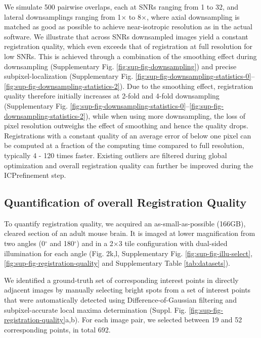 We simulate 500 pairwise overlaps, each at SNRs ranging from 1 to 32, and lateral downsamplings ranging from 1$\times$ to 8$\times$, where axial downsampling is matched as good as possible to achieve near-isotropic resolution as in the actual software. We illustrate that across SNRs downsampled images yield a constant registration quality, which even exceeds that of registration at full resolution for low SNRs. This is achieved through a combination of the smoothing effect during downsampling (Supplementary Fig. \ref{fig:sup-fig-downsampling}) and precise subpixel-localization (Supplementary Fig. \ref{fig:sup-fig-downsampling-statistics-0}--\ref{fig:sup-fig-downsampling-statistics-2}). Due to the smoothing effect, registration quality therefore initially increases at 2-fold and 4-fold downsampling (Supplementary Fig. \ref{fig:sup-fig-downsampling-statistics-0}--\ref{fig:sup-fig-downsampling-statistics-2}), while when using more downsampling, the loss of pixel resolution outweighs the effect of smoothing and hence the quality drops. Registrations with a constant quality of an average error of below one pixel can be computed at a fraction of the computing time compared to full resolution, typically 4 - 120 times faster. Existing outliers are filtered during global optimization and overall registration quality can further be improved during the ICP\cite{icp }refinement step.

\subsection*{Quantification of overall Registration Quality}

To quantify registration quality, we acquired an as-small-as-possible (166GB), cleared section of an adult mouse brain. It is imaged at lower magnification from two angles (0${}^\circ$ and 180${}^\circ$) and in a 2$\times$3 tile configuration with dual-sided illumination for each angle (Fig. 2k,l, Supplementary Fig. \ref{fig:sup-fig-illu-select},\ref{fig:sup-fig-registration-quality} and Supplementary Table \ref{tab:datasets}).

We identified a ground-truth set of corresponding interest points in directly adjacent images by manually selecting bright spots from a set of interest points that were automatically detected using Difference-of-Gaussian filtering and subpixel-accurate local maxima determination (Suppl. Fig. \ref{fig:sup-fig-registration-quality}a,b). For each image pair, we selected between 19 and 52 corresponding points, in total 692.

